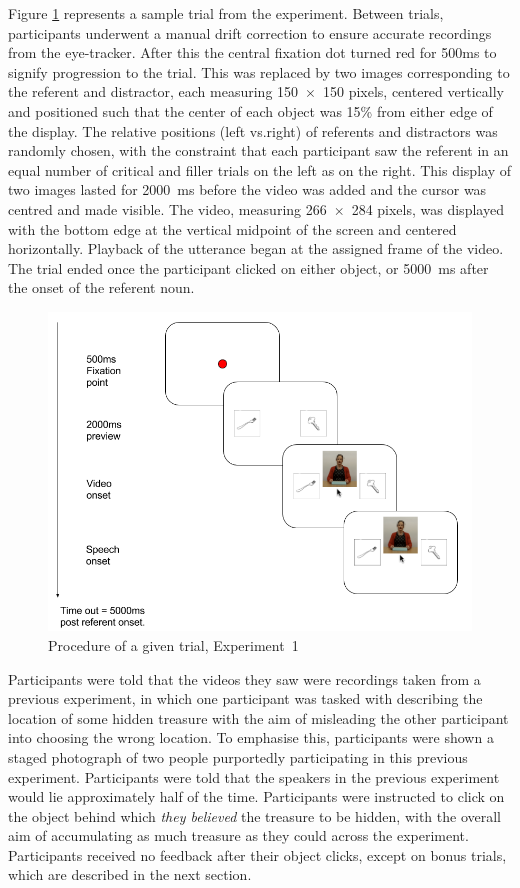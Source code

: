 \documentclass[a4paper,man,natbib]{apa6}
\begin{document}
Figure \ref{fig:v1_trial} represents a sample trial from the experiment. 
Between trials, participants underwent a manual drift correction to ensure accurate recordings from the eye-tracker.
After this the central fixation dot turned red for 500ms to signify progression to the trial. 
This was replaced by two images corresponding to the referent and distractor, each measuring 150~$\times$~150 pixels, centered vertically and positioned such that the center of each object was 15\% from either edge of the display. 
The relative positions (left vs.\@ right) of referents and distractors was randomly chosen, with the constraint that each participant saw the referent in an equal number of critical and filler trials on the left as on the right.
This display of two images lasted for 2000~ms before the video was added and the cursor was centred and made visible.
The video, measuring 266~$\times$~284 pixels, was displayed with the bottom edge at the vertical midpoint of the screen and centered horizontally.
Playback of the utterance began at the assigned frame of the video.
The trial ended once the participant clicked on either object, or 5000~ms after the onset of the referent noun.

\begin{figure}[Ht]
  \centering
	\includegraphics[width=\linewidth]{./img/e7_trial.png}
  \caption{Procedure of a given trial, Experiment~1}
  \label{fig:v1_trial}
\end{figure}

Participants were told that the videos they saw were recordings taken from a previous experiment, in which one participant was tasked with describing the location of some hidden treasure with the aim of misleading the other participant into choosing the wrong location.
To emphasise this, participants were shown a staged photograph of two people purportedly participating in this previous experiment. 
Participants were told that the speakers in the previous experiment would lie approximately half of the time. 
Participants were instructed to click on the object behind which \textit{they believed} the treasure to be hidden, with the overall aim of accumulating as much treasure as they could across the experiment.
Participants received no feedback after their object clicks, except on bonus trials, which are described in the next section.
\end{document}
